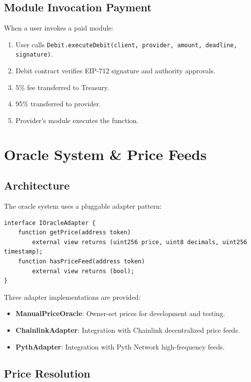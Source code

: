 \documentclass[11pt,a4paper]{article}
\begin{document}
\subsection{Module Invocation Payment}

When a user invokes a paid module:
\begin{enumerate}
    \item User calls \texttt{Debit.executeDebit(client, provider, amount, deadline, signature)}.
    \item Debit contract verifies EIP-712 signature and authority approvals.
    \item 5\% fee transferred to Treasury.
    \item 95\% transferred to provider.
    \item Provider's module executes the function.
\end{enumerate}

\section{Oracle System \& Price Feeds}
\label{sec:oracle}

\subsection{Architecture}

The oracle system uses a pluggable adapter pattern:

\begin{lstlisting}[style=solidity]
interface IOracleAdapter {
    function getPrice(address token)
        external view returns (uint256 price, uint8 decimals, uint256 timestamp);
    function hasPriceFeed(address token)
        external view returns (bool);
}
\end{lstlisting}

Three adapter implementations are provided:
\begin{itemize}
    \item \textbf{ManualPriceOracle}: Owner-set prices for development and testing.
    \item \textbf{ChainlinkAdapter}: Integration with Chainlink decentralized price feeds.
    \item \textbf{PythAdapter}: Integration with Pyth Network high-frequency feeds.
\end{itemize}

\subsection{Price Resolution}
\end{document}
